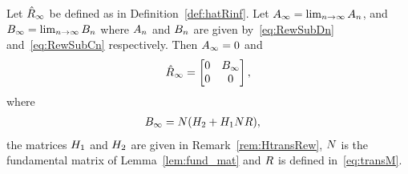\begin{theorem}
	\label{thm:hatR_inf}
	Let $\hat{R}_{\infty}$ be defined as in Definition~\ref{def:hatRinf}. Let $A_{\infty} = \lim_{n \to \infty} A_{n}$, and $B_{\infty} = \lim_{n \to \infty} B_{n}$ where $A_{n}$ and $B_{n}$ are given by~\eqref{eq:RewSubDn} and~\eqref{eq:RewSubCn} respectively.  Then $A_{\infty} = 0$ and %
	\begin{equation}
	\label{eq:hatRnInf_matrix}
		\hat{R}_{\infty} = 
		\begin{bmatrix}
			0 & B_{\infty} \\
			0 & 0 
		\end{bmatrix},
	\end{equation}	
	where
	\begin{align}
		\label{eq:RewSubCInf}
		B_{\infty} &= N(H_{2} + H_{1}NR),
	\end{align}
	the matrices $H_{1}$ and $H_{2}$ are given in Remark~\ref{rem:HtransRew}, $N$ is the fundamental matrix of Lemma~\ref{lem:fund_mat} and $R$ is defined in~\eqref{eq:transM}.
\end{theorem}

